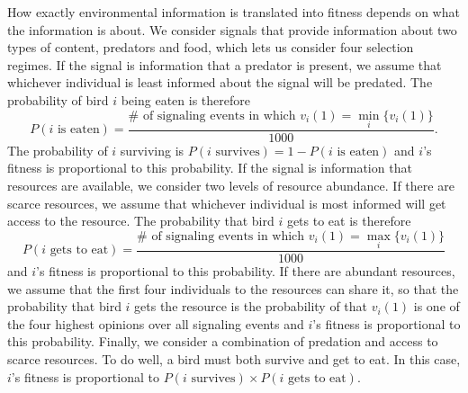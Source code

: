 \documentclass{article}
\begin{document}
How exactly environmental information is translated into fitness depends on what the information is about. We consider signals that provide information about two types of content, predators and food, which lets us consider four selection regimes.  If the signal is information that a predator is present, we assume that whichever individual is least informed about the signal will be predated. The probability of bird $i$ being eaten is therefore 
\begin{equation*}
P(\text{$i$ is eaten})=\frac{\# \text{ of signaling events in which } v_i(1)=\min_i\{v_i(1)\}}{1000}.
\end{equation*}
The probability of $i$ surviving is $P(\text{$i$ survives})=1-P(\text{$i$ is eaten})$ and $i$'s fitness is proportional to this probability. If the signal is information that resources are available, we consider two levels of resource abundance. If there are scarce resources, we assume that whichever individual is most informed will get access to the resource. The probability that bird $i$ gets to eat is therefore 
\begin{equation*}
P(\text{$i$ gets to eat})=\frac{\# \text{ of signaling events in which } v_i(1)=\max_i\{v_i(1)\}}{1000}
\end{equation*}
and $i$'s fitness is proportional to this probability.  If there are abundant resources, we assume that the first four individuals to the resources can share it, so that the probability that bird $i$ gets the resource is the probability of that $v_i(1)$ is one of the four highest opinions over all signaling events and $i$'s fitness is proportional to this probability.  Finally, we consider a combination of predation and access to scarce resources. To do well, a bird must both survive and get to eat. In this case, $i$'s fitness is proportional to $P(\text{$i$ survives})\times P(\text{$i$ gets to eat})$. 

  
\end{document}
